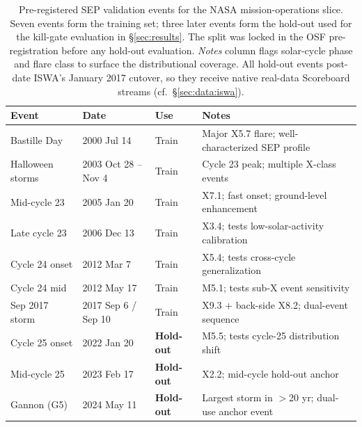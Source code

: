 \begin{table}[!htbp]
  \centering
  \small
  \caption{Pre-registered SEP validation events for the NASA mission-operations
    slice. Seven events form the training set; three later events form the
    hold-out used for the kill-gate evaluation in §\ref{sec:results}.
    The split was locked in the OSF pre-registration \cite{osf_prereg} before
    any hold-out evaluation. \emph{Notes} column flags solar-cycle phase and
    flare class to surface the distributional coverage. All hold-out events
    post-date ISWA's January 2017 cutover, so they receive native real-data
    Scoreboard streams (cf.\ §\ref{sec:data:iswa}).}
  \label{tab:table-3-1}
  \begin{tabular}{@{}l l l l@{}}
    \toprule
    Event & Date & Use & Notes \\
    \midrule
    Bastille Day              & 2000 Jul 14                  & Train      & Major X5.7 flare; well-characterized SEP profile \\
    Halloween storms          & 2003 Oct 28 -- Nov 4         & Train      & Cycle 23 peak; multiple X-class events \\
    Mid-cycle 23              & 2005 Jan 20                  & Train      & X7.1; fast onset; ground-level enhancement \\
    Late cycle 23             & 2006 Dec 13                  & Train      & X3.4; tests low-solar-activity calibration \\
    Cycle 24 onset            & 2012 Mar 7                   & Train      & X5.4; tests cross-cycle generalization \\
    Cycle 24 mid              & 2012 May 17                  & Train      & M5.1; tests sub-X event sensitivity \\
    Sep 2017 storm            & 2017 Sep 6 / Sep 10          & Train      & X9.3 + back-side X8.2; dual-event sequence \\
    \addlinespace
    Cycle 25 onset            & 2022 Jan 20                  & \textbf{Hold-out} & M5.5; tests cycle-25 distribution shift \\
    Mid-cycle 25              & 2023 Feb 17                  & \textbf{Hold-out} & X2.2; mid-cycle hold-out anchor \\
    Gannon (G5)               & 2024 May 11                  & \textbf{Hold-out} & Largest storm in $>$20 yr; dual-use anchor event \\
    \bottomrule
  \end{tabular}
\end{table}
